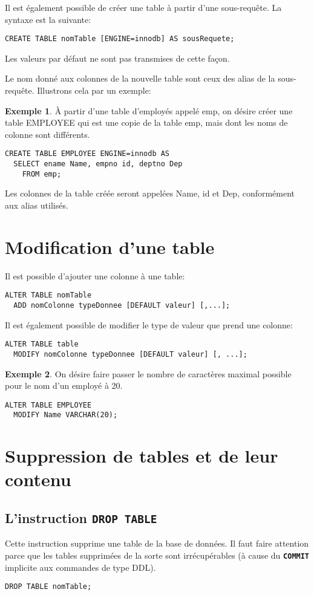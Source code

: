 \documentclass[a4paper, 12pt]{report}
\newcommand{\textSQL}[1]{\texttt{\textbf{#1}}}
\theoremstyle{definition} \newtheorem{ex}{Exemple}
\begin{document}
Il est également possible de créer une table à partir d'une sous-requête. La syntaxe est la suivante:
\begin{lstlisting}[frame=single]
CREATE TABLE nomTable [ENGINE=innodb] AS sousRequete;
\end{lstlisting}
Les valeurs par défaut ne sont pas transmises de cette façon.

Le nom donné aux colonnes de la nouvelle table sont ceux des alias de la sous-requête. Illustrons cela par un exemple:
\begin{ex}
\`A partir d'une table d'employés appelé emp, on désire créer une table EMPLOYEE qui est une copie de la table emp, mais dont les noms de colonne sont différents.
\begin{lstlisting}[frame=single]
CREATE TABLE EMPLOYEE ENGINE=innodb AS
  SELECT ename Name, empno id, deptno Dep
	FROM emp;
\end{lstlisting}
Les colonnes de la table créée seront appelées Name, id et Dep, conformément aux alias utilisés.
\end{ex}

\section{Modification d'une table}
Il est possible d'ajouter une colonne à une table:
\begin{lstlisting}[frame=single]
ALTER TABLE nomTable
  ADD nomColonne typeDonnee [DEFAULT valeur] [,...];
\end{lstlisting}

Il est également possible de modifier le type de valeur que prend une colonne:
\begin{lstlisting}[frame=single]
ALTER TABLE table
  MODIFY nomColonne typeDonnee [DEFAULT valeur] [, ...];
\end{lstlisting}
\begin{ex}
On désire faire passer le nombre de caractères maximal possible pour le nom d'un employé à 20.
\begin{lstlisting}[frame=single]
ALTER TABLE EMPLOYEE
  MODIFY Name VARCHAR(20);
\end{lstlisting}
\end{ex}

\section{Suppression de tables et de leur contenu}
\subsection{L'instruction \textSQL{DROP TABLE}}
Cette instruction supprime une table de la base de données. Il faut faire attention parce que les tables supprimées de la sorte sont irrécupérables (à cause du \textSQL{COMMIT} implicite aux commandes de type DDL).
\begin{lstlisting}[frame=single]
DROP TABLE nomTable;
\end{lstlisting}
\end{document}
